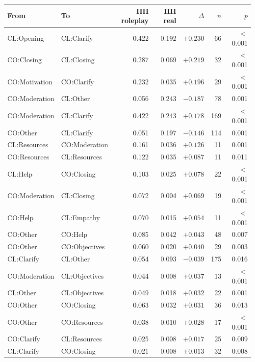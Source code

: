 \begin{tabular}{llrrrrr}
\toprule
From & To & HH roleplay & HH real & $\Delta$ & $n$ & $p$ \\
\midrule
CL:Opening & CL:Clarify & 0.422 & 0.192 & $+0.230$ & 66 & $<$0.001 \\
CO:Closing & CL:Closing & 0.287 & 0.069 & $+0.219$ & 32 & $<$0.001 \\
CO:Motivation & CO:Clarify & 0.232 & 0.035 & $+0.196$ & 29 & $<$0.001 \\
CO:Moderation & CL:Other & 0.056 & 0.243 & $-0.187$ & 78 & 0.001 \\
CO:Moderation & CL:Clarify & 0.422 & 0.243 & $+0.178$ & 169 & $<$0.001 \\
CO:Other & CL:Clarify & 0.051 & 0.197 & $-0.146$ & 114 & 0.001 \\
CL:Resources & CO:Moderation & 0.161 & 0.036 & $+0.126$ & 11 & 0.001 \\
CO:Resources & CL:Resources & 0.122 & 0.035 & $+0.087$ & 11 & 0.011 \\
CL:Help & CO:Closing & 0.103 & 0.025 & $+0.078$ & 22 & $<$0.001 \\
CO:Moderation & CL:Closing & 0.072 & 0.004 & $+0.069$ & 19 & $<$0.001 \\
CO:Help & CL:Empathy & 0.070 & 0.015 & $+0.054$ & 11 & $<$0.001 \\
CO:Other & CO:Help & 0.085 & 0.042 & $+0.043$ & 48 & 0.007 \\
CO:Other & CO:Objectives & 0.060 & 0.020 & $+0.040$ & 29 & 0.003 \\
CL:Clarify & CL:Other & 0.054 & 0.093 & $-0.039$ & 175 & 0.016 \\
CO:Moderation & CL:Objectives & 0.044 & 0.008 & $+0.037$ & 13 & $<$0.001 \\
CL:Other & CL:Objectives & 0.049 & 0.018 & $+0.032$ & 22 & 0.001 \\
CO:Other & CO:Closing & 0.063 & 0.032 & $+0.031$ & 36 & 0.013 \\
CO:Other & CO:Resources & 0.038 & 0.010 & $+0.028$ & 17 & $<$0.001 \\
CO:Clarify & CL:Resources & 0.025 & 0.008 & $+0.017$ & 25 & 0.009 \\
CL:Clarify & CO:Closing & 0.021 & 0.008 & $+0.013$ & 32 & 0.008 \\
\bottomrule
\end{tabular}
